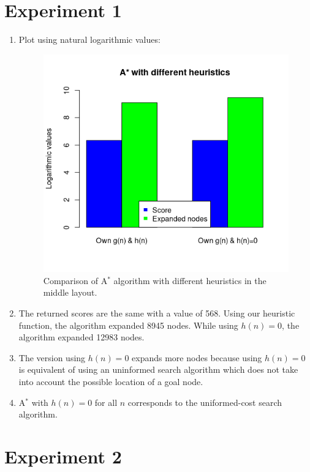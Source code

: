 \documentclass{article}
\begin{document}
\section{Experiment 1}

\begin{enumerate}[label=\alph*.,leftmargin=1.35em]
    \item Plot using natural logarithmic values:\\
    \begin{figure}[H]
        \centering
        \includegraphics[scale=0.7]{q3_plot.png} 
        \caption{Comparison of A$^*$ algorithm with different heuristics in the middle layout.}
    \end{figure}
    \item The returned scores are the same with a value of 568. Using our heuristic function, the algorithm expanded 8945 nodes. While using $h(n) = 0$, the algorithm expanded 12983 nodes.
    \item The version using $h(n) = 0$ expands more nodes because using $h(n) = 0$ is equivalent of using an uninformed search algorithm which does not take into account the possible location of a goal node.
    \item A$^*$ with $h(n) = 0$ for all $n$ corresponds to the uniformed-cost search algorithm.
\end{enumerate}

\section{Experiment 2}
\end{document}
